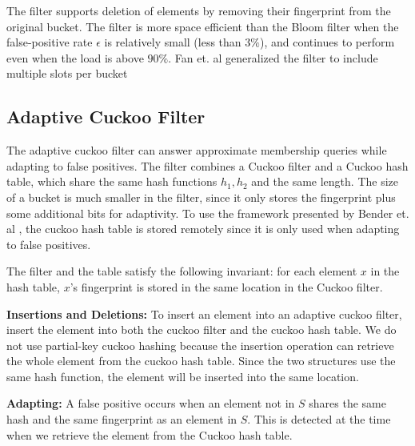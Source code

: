 \documentclass[../paper.tex]{subfiles}
\begin{document}
The filter supports deletion of elements by removing their fingerprint from the original bucket. The filter is more space efficient than the Bloom filter when the false-positive rate $\epsilon$ is relatively small (less than $3\%$), and continues to perform even when the load is above $90\%$.
Fan et. al generalized the filter to include multiple slots per bucket

\subsection{Adaptive Cuckoo Filter}
The adaptive cuckoo filter \cite{adaptive-cuckoo} can answer approximate membership queries while adapting to false positives. The filter combines a Cuckoo filter and a Cuckoo hash table,
which share the same hash functions $h_1,h_2$ and the same length. The size of a bucket is much smaller in the filter, since it only stores the fingerprint plus some additional bits for adaptivity.
To use the framework presented by Bender et. al \cite{broom-filter}, the cuckoo hash table is stored remotely since it is only used when adapting to false positives.

The filter and the table satisfy the following invariant: for each element $x$ in the hash table, $x$'s fingerprint is stored in the same location in the Cuckoo filter.

\textbf{Insertions and Deletions:} To insert an element into an adaptive cuckoo filter, insert the element into both the cuckoo filter and the cuckoo hash table. We do not use partial-key cuckoo hashing because
the insertion operation can retrieve the whole element from the cuckoo hash table. Since the two structures use the same hash function, the element will be inserted into the same location.

\textbf{Adapting:} A false positive occurs when an element not in $S$ shares the same hash and the same fingerprint as an element in $S$. This is detected at the time when we retrieve the element from the
Cuckoo hash table. 

\end{document}
